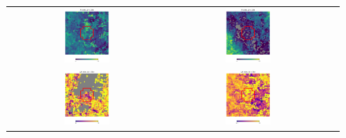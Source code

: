 \documentclass[preprintm,linenumbers]{aastex631}
\begin{document}
\begin{figure}
\begin{tabular}{  c c c}
				\includegraphics[width=0.3\textwidth]{results/skymaps_cutout/skymaps_cutout_first_year_one_snap_v4_0_10yrs_db_noDD_noTwi_tscale-28_nside-256_doAllTemplateMetrics_reduceCount_r_WFD_noDD_noTwi.pdf} &
				\includegraphics[width=0.3\textwidth]{results/skymaps_cutout/skymaps_cutout_first_year_one_snap_v4_0_10yrs_db_noDD_noTwi_tscale-28_nside-256_doAllTemplateMetrics_reduceCount_r_GP_noDD_noTwi.pdf} \\
				\includegraphics[width=0.3\textwidth]{results/skymaps_cutout/skymaps_cutout_delta_first_year_one_snap_v4_0_10yrs_db_noDD_noTwi_tscale-28_nside-256_doAllTemplateMetrics_reduceCount_r_NES_noDD_noTwi.pdf} &
				\includegraphics[width=0.3\textwidth]{results/skymaps_cutout/skymaps_cutout_delta_first_year_one_snap_v4_0_10yrs_db_noDD_noTwi_tscale-28_nside-256_doAllTemplateMetrics_reduceCount_r_WFD_noDD_noTwi.pdf} &

\end{tabular}
\end{figure}
\end{document}
